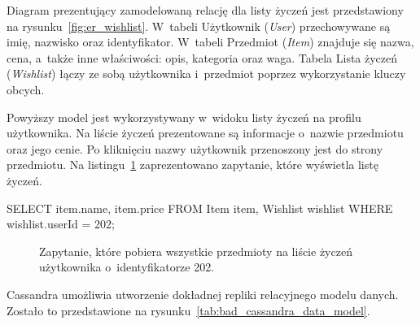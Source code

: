 Diagram prezentujący zamodelowaną relację dla listy życzeń jest przedstawiony na rysunku~\ref{fig:er_wishlist}. W~tabeli Użytkownik (\emph{User}) przechowywane są imię, nazwisko oraz identyfikator. W~tabeli Przedmiot (\emph{Item}) znajduje się nazwa, cena, a~także inne właściwości: opis, kategoria oraz waga. Tabela Lista życzeń (\emph{Wishlist}) łączy ze sobą użytkownika i~przedmiot poprzez wykorzystanie kluczy obcych. 

Powyższy model jest wykorzystywany w~widoku listy życzeń na profilu użytkownika. Na liście życzeń prezentowane są informacje o~nazwie przedmiotu oraz jego cenie. Po kliknięciu nazwy użytkownik przenoszony jest do strony przedmiotu. Na listingu~\ref{lst:sql_wishlist} zaprezentowano zapytanie, które wyświetla listę życzeń.

\begin{verbbox}
	SELECT item.name, item.price
	FROM Item item, Wishlist wishlist
	WHERE wishlist.userId = 202;
\end{verbbox}

\begin{figure}[ht!]
	\centering
	\theverbbox

	\caption{Zapytanie, które pobiera wszystkie przedmioty na liście życzeń użytkownika o~identyfikatorze 202.}
	\label{lst:sql_wishlist}
\end{figure}

Cassandra umożliwia utworzenie dokładnej repliki relacyjnego modelu danych. Zostało to przedstawione na rysunku~\ref{tab:bad_cassandra_data_model}.

